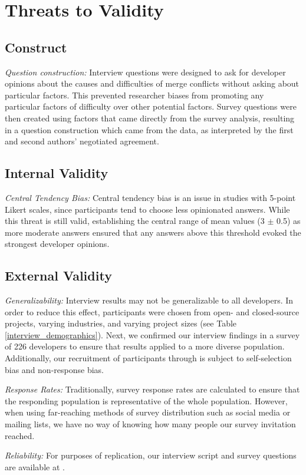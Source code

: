 \section{Threats to Validity}\label{threats}
\subsection{Construct}
\textit{Question construction:}
Interview questions were designed to ask for developer opinions about the causes and difficulties of merge conflicts without asking about particular factors. This prevented researcher biases from promoting any particular factors of difficulty over other potential factors. 
Survey questions were then created using factors that came directly from the survey analysis, resulting in a question construction which came from the data, as interpreted by the first and second authors' negotiated agreement.
\subsection{Internal Validity}
\textit{Central Tendency Bias:}
Central tendency bias \cite{guilford1954psychometric} is an issue in studies with 5-point Likert scales, since participants tend to choose less opinionated answers. While this threat is still valid, establishing the central range of mean values (3 $\pm$ 0.5) as more moderate answers ensured that any answers above this threshold evoked the strongest developer opinions.
\subsection{External Validity}
\textit{Generalizability:}
Interview results may not be generalizable to all developers. In order to reduce this effect, participants were chosen from open- and closed-source projects, varying industries, and varying project sizes (see Table \ref{interview_demographics}). Next, we confirmed our interview findings in a survey of 226 developers to ensure that results applied to a more diverse population. Additionally, our recruitment of participants through is subject to self-selection bias and non-response bias.

\textit{Response Rates:}
Traditionally, survey response rates are calculated to ensure that the responding population is representative of the whole population. However, when using far-reaching methods of survey distribution such as social media or mailing lists, we have no way of knowing how many people our survey invitation reached.

\textit{Reliability:}
For purposes of replication, our interview script and survey questions are available at \cite{companion_site}. 
